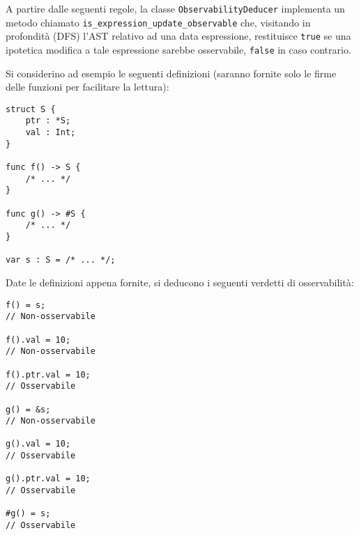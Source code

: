 A partire dalle seguenti regole, la classe \texttt{ObservabilityDeducer} implementa un metodo
chiamato \texttt{is\_expression\_update\_observable} che, visitando in profondità (DFS) l'AST relativo
ad una data espressione, restituisce \texttt{true} se una ipotetica modifica a tale 
espressione sarebbe osservabile, \texttt{false} in caso contrario. \\

\newpage

Si considerino ad esempio le seguenti definizioni (saranno fornite solo le firme 
delle funzioni per facilitare la lettura): \\

\vspace{0.5cm}
\begin{lstlisting}[frame=single]
struct S {
    ptr : *S;
    val : Int;
}

func f() -> S { 
    /* ... */ 
}

func g() -> #S { 
    /* ... */ 
}

var s : S = /* ... */;
\end{lstlisting}
\vspace{0.5cm}

Date le definizioni appena fornite, si deducono i seguenti verdetti di 
osservabilità: \\

\vspace{0.5cm}
\begin{lstlisting}[frame=single]
f() = s; 
// Non-osservabile

f().val = 10; 
// Non-osservabile

f().ptr.val = 10; 
// Osservabile

g() = &s; 
// Non-osservabile

g().val = 10; 
// Osservabile

g().ptr.val = 10; 
// Osservabile

#g() = s; 
// Osservabile
\end{lstlisting}
\vspace{0.5cm}

\newpage